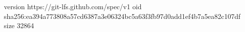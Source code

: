 version https://git-lfs.github.com/spec/v1
oid sha256:ea394a773808a57cd6387a3e06324bc5a63f3fb97d0add1ef4b7a5ea82c107df
size 32864
